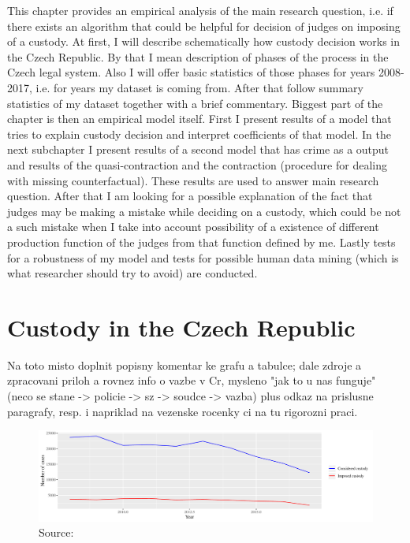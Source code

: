 \documentclass[12pt, twoside]{book} %
\begin{document}
This chapter provides an empirical analysis of the main research question, i.e. if there exists an algorithm that could be helpful for decision of judges on imposing of a custody. At first, I will describe schematically how custody decision works in the Czech Republic. By that I mean description of phases of the process in the Czech legal system. Also I will offer basic statistics of those phases for years 2008-2017, i.e. for years my dataset is coming from. After that follow summary statistics of my dataset together with a brief commentary.\newline
Biggest part of the chapter is then an empirical model itself. First I present results of a model that tries to explain custody decision and interpret coefficients of that model. In the next subchapter I present results of a second model that has crime as a output and results of the quasi-contraction and the contraction (procedure for dealing with missing counterfactual). These results are used to answer main research question. After that I am looking for a possible explanation of the fact that judges may be making a mistake while deciding on a custody, which could be not a such mistake when I take into account possibility of a existence of different production function of the judges from that function defined by me. Lastly tests for a robustness of my model and tests for possible human data mining (which is what researcher should try to avoid) are conducted. 


\section{Custody in the Czech Republic}      %

Na toto misto doplnit popisny komentar ke grafu a tabulce; dale zdroje a zpracovani priloh a rovnez info o 
vazbe v Cr, mysleno "jak to u nas funguje" (neco se stane -> policie -> sz -> soudce -> vazba) plus odkaz na prislusne paragrafy, resp. i napriklad na vezenske rocenky ci na tu rigorozni praci. 


\begin{figure}[H]
\includegraphics[width=\textwidth]{plot_21_1.pdf}
{\small Source: }
\end{figure}
\end{document}
